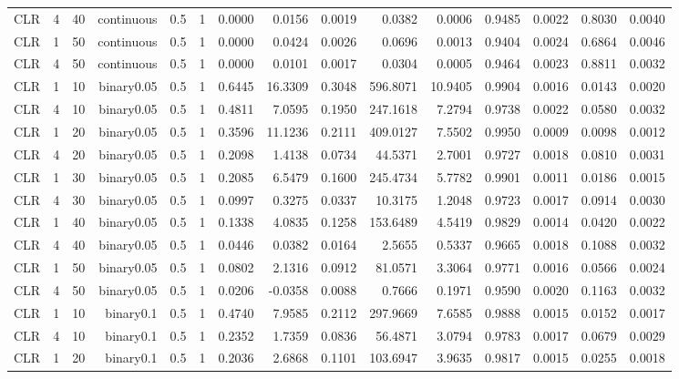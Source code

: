 \begin{longtable}{rrrrrrrrrrrrrrr}
  CLR & 4 & 40 & continuous & 0.5 & 1 & 0.0000 & 0.0156 & 0.0019 & 0.0382 & 0.0006 & 0.9485 & 0.0022 & 0.8030 & 0.0040 \\ 
  CLR & 1 & 50 & continuous & 0.5 & 1 & 0.0000 & 0.0424 & 0.0026 & 0.0696 & 0.0013 & 0.9404 & 0.0024 & 0.6864 & 0.0046 \\ 
  CLR & 4 & 50 & continuous & 0.5 & 1 & 0.0000 & 0.0101 & 0.0017 & 0.0304 & 0.0005 & 0.9464 & 0.0023 & 0.8811 & 0.0032 \\ 
  CLR & 1 & 10 & binary0.05 & 0.5 & 1 & 0.6445 & 16.3309 & 0.3048 & 596.8071 & 10.9405 & 0.9904 & 0.0016 & 0.0143 & 0.0020 \\ 
  CLR & 4 & 10 & binary0.05 & 0.5 & 1 & 0.4811 & 7.0595 & 0.1950 & 247.1618 & 7.2794 & 0.9738 & 0.0022 & 0.0580 & 0.0032 \\ 
  CLR & 1 & 20 & binary0.05 & 0.5 & 1 & 0.3596 & 11.1236 & 0.2111 & 409.0127 & 7.5502 & 0.9950 & 0.0009 & 0.0098 & 0.0012 \\ 
  CLR & 4 & 20 & binary0.05 & 0.5 & 1 & 0.2098 & 1.4138 & 0.0734 & 44.5371 & 2.7001 & 0.9727 & 0.0018 & 0.0810 & 0.0031 \\ 
  CLR & 1 & 30 & binary0.05 & 0.5 & 1 & 0.2085 & 6.5479 & 0.1600 & 245.4734 & 5.7782 & 0.9901 & 0.0011 & 0.0186 & 0.0015 \\ 
  CLR & 4 & 30 & binary0.05 & 0.5 & 1 & 0.0997 & 0.3275 & 0.0337 & 10.3175 & 1.2048 & 0.9723 & 0.0017 & 0.0914 & 0.0030 \\ 
  CLR & 1 & 40 & binary0.05 & 0.5 & 1 & 0.1338 & 4.0835 & 0.1258 & 153.6489 & 4.5419 & 0.9829 & 0.0014 & 0.0420 & 0.0022 \\ 
  CLR & 4 & 40 & binary0.05 & 0.5 & 1 & 0.0446 & 0.0382 & 0.0164 & 2.5655 & 0.5337 & 0.9665 & 0.0018 & 0.1088 & 0.0032 \\ 
  CLR & 1 & 50 & binary0.05 & 0.5 & 1 & 0.0802 & 2.1316 & 0.0912 & 81.0571 & 3.3064 & 0.9771 & 0.0016 & 0.0566 & 0.0024 \\ 
  CLR & 4 & 50 & binary0.05 & 0.5 & 1 & 0.0206 & -0.0358 & 0.0088 & 0.7666 & 0.1971 & 0.9590 & 0.0020 & 0.1163 & 0.0032 \\ 
  CLR & 1 & 10 & binary0.1 & 0.5 & 1 & 0.4740 & 7.9585 & 0.2112 & 297.9669 & 7.6585 & 0.9888 & 0.0015 & 0.0152 & 0.0017 \\ 
  CLR & 4 & 10 & binary0.1 & 0.5 & 1 & 0.2352 & 1.7359 & 0.0836 & 56.4871 & 3.0794 & 0.9783 & 0.0017 & 0.0679 & 0.0029 \\ 
  CLR & 1 & 20 & binary0.1 & 0.5 & 1 & 0.2036 & 2.6868 & 0.1101 & 103.6947 & 3.9635 & 0.9817 & 0.0015 & 0.0255 & 0.0018 \\ 

\end{longtable}
